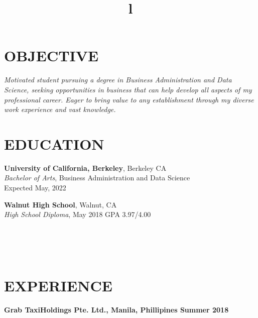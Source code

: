 \documentclass[margin]{res}
\begin{document}
\begin{resume}

\section{OBJECTIVE}
{\sl Motivated student pursuing a degree in Business Administration and Data Science, seeking opportunities in business that can help develop all aspects of my professional career. Eager to bring value to any establishment through my diverse work experience and vast knowledge. }

\section{EDUCATION}
\textbf{University of California, Berkeley}, Berkeley CA\\
{\sl Bachelor of Arts}, Business Administration and Data Science\\
Expected May, 2022

\textbf{Walnut High School}, Walnut, CA \\
{\sl High School Diploma}, 
May 2018
\hfill GPA 3.97/4.00



\begin{format}
\title{l}\\
\\
\body\\
\end{format}

\section{EXPERIENCE}

\textbf{Grab TaxiHoldings Pte. Ltd., Manila, Phillipines \hfill{Summer 2018}\\}



\end{resume}
\end{document}
